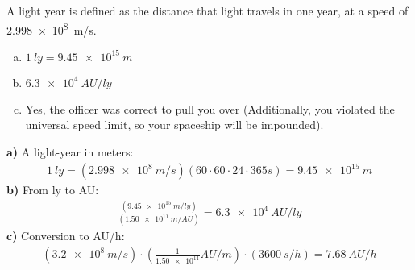 \question A light year is defined as the distance that light travels in one year, at a speed of \SI{2.998e8}{m/s}.
\label{q:unitsanddimensions:lightyear}

\begin{finalanswer}
\begin{enumerate}[(a)]
\item $\SI{1}{ly}=\SI{9.45e15}{m}$
\item $\SI{6.3e4}{AU/ly}$
\item Yes, the officer was correct to pull you over (Additionally, you violated the universal speed limit, so your spaceship will be impounded). 
\end{enumerate}
\end{finalanswer}
\begin{solution}
\textbf{a)} A light-year in meters:
\begin{align*}
\SI{1}{ly}=(\SI{2.998e8}{m/s})(60\cdot 60\cdot 24\cdot 365\si{s})=\SI{9.45e15}{m}
\end{align*}
\textbf{b)} From \si{ly} to \si{AU}:
\begin{align*}
\frac{(\SI{9.45e15}{m/ly})}{(\SI{1.50e11}{m/AU})}=\SI{6.3e4}{AU/ly}
\end{align*}
\textbf{c)} Conversion to \si{AU/h}:
\begin{align*}
(\SI{3.2e8}{m/s})\cdot\left(\frac{1}{\num{1.50e11}}\si{AU/m}\right)\cdot(\SI{3600}{s/h})=\SI{7.68}{AU/h}
\end{align*}
\end{solution}

